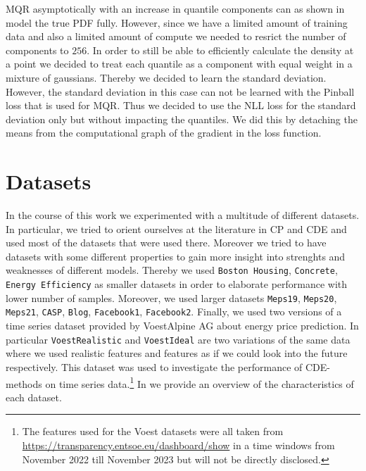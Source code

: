 MQR asymptotically with an increase in quantile components can as shown in  model the true PDF fully. However, since we have a limited amount of training data and also a limited amount of compute we needed to resrict the number of components to $256$. In order to still be able to efficiently calculate the density at a point we decided to treat each quantile as a component with equal weight in a mixture of gaussians. Thereby we decided to learn the standard deviation. However, the standard deviation in this case can not be learned with the Pinball loss that is used for MQR. Thus we decided to use the NLL loss for the standard deviation only but without impacting the quantiles. We did this by detaching the means from the computational graph of the gradient in the loss function.

\section{Datasets}

In the course of this work we experimented with a multitude of different datasets. In particular, we tried to orient ourselves at the literature in CP and CDE \cite{rothfuss2019noise,sesia2021conformal} and used most of the datasets that were used there. Moreover we tried to have datasets with some different properties to gain more insight into strenghts and weaknesses of different models. Thereby we used \texttt{Boston Housing}, \texttt{Concrete}, \texttt{Energy Efficiency} as smaller datasets in order to elaborate performance with lower number of samples. Moreover, we used larger datasets \texttt{Meps19}, \texttt{Meps20}, \texttt{Meps21}, \texttt{CASP}, \texttt{Blog}, \texttt{Facebook1}, \texttt{Facebook2}. Finally, we used two versions of a time series dataset provided by VoestAlpine AG about energy price prediction. In particular \texttt{VoestRealistic} and \texttt{VoestIdeal} are two variations of the same data where we used realistic features and features as if we could look into the future respectively. This dataset was used to investigate the performance of CDE-methods on time series data.\footnote{The features used for the Voest datasets were all taken from \url{https://transparency.entsoe.eu/dashboard/show} in a time windows from November 2022 till November 2023 but will not be directly disclosed.} In  we provide an overview of the characteristics of each dataset.

